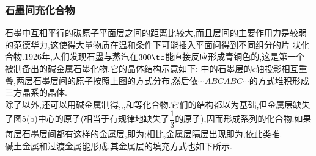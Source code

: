 \documentclass[draft]{ctexart}
\begin{document}
\subsubsection{石墨间充化合物}
石墨中互相平行的碳原子平面层之间的距离比较大,而且层间的主要作用力是较弱的范德华力,这使得大量物质在温和条件下可能插入平面问得到不同组分的片
状化合物.1926年,人们发现石墨与蒸汽在$300\tc$能直接反应形成青铜色的,这是第一个被制备出的碱金属石墨化物.它的晶体结构示意如下:
中的石墨层的$c$轴投影相互重叠,两层石墨层间的原子按照上图的方式分布,然后依$\cdots ABCABC\cdots$的方式堆积形成三方晶系的晶体.\\
\indent 除了以外,还可以用碱金属制得,,,和等化合物.它们的结构都以为基础,但金属层缺失了图5(b)中心的原子(相当于有规律地缺失了$\dfrac13$的原子),因而形成系列的化合物.如果每层石墨层间都有这样的金属层,即为;相比,金属层隔层出现即为,依此类推.\\
\indent 碱土金属和过渡金属能形成,其金属层的填充方式也如下所示.
\end{document}

